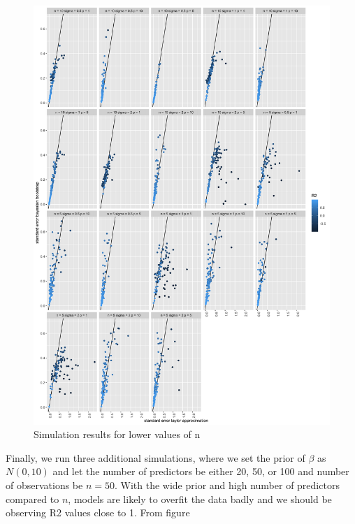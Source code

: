 \documentclass{article}
\begin{document}
\begin{figure}
    \centering
    \includegraphics[width=\textwidth]{simres_low_n.png}
    \caption{ Simulation results for lower values of n}
    \label{fig:simres_low_n}
\end{figure}

Finally, we run three additional simulations, where we set the prior of $\beta$ as $N(0, 10)$ and let the number of predictors be either 20, 50, or 100 and number of observations be $n = 50$. With the wide prior and high number of predictors compared to $n$, models are likely to overfit the data badly and we should be observing R2 values close to 1. From figure 

\newpage


\end{document}
